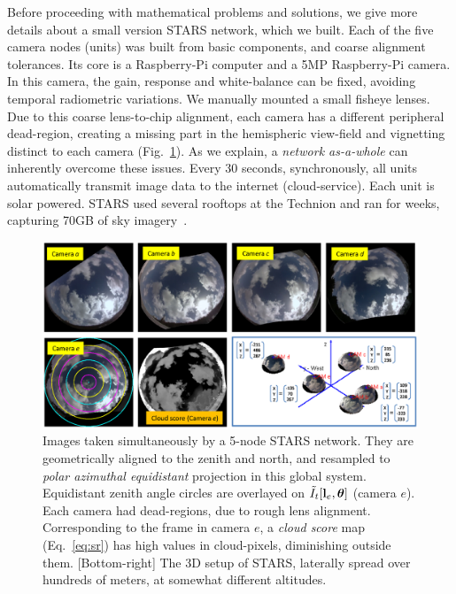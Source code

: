 \documentclass[runningheads]{llncs}
\begin{document}
Before proceeding with mathematical problems and solutions, we give more details about a small version STARS network, which we built. Each of the five camera nodes (units) was built from basic components, and coarse alignment tolerances. Its core is a Raspberry-Pi computer and a 5MP Raspberry-Pi camera. In this camera, the gain, response and white-balance can be fixed, avoiding temporal radiometric variations. We manually mounted a small fisheye lenses. Due to this coarse lens-to-chip alignment, each camera has a different peripheral dead-region, creating a missing part in the hemispheric view-field and vignetting distinct to each camera (Fig.~\ref{fig:photomotion}). As we explain, a {\em {\em network} as-a-whole} can inherently overcome these issues. Every 30 seconds, synchronously, all units automatically transmit image data to the internet (cloud-service). Each unit is solar powered.
STARS used several rooftops at the Technion and ran for weeks, capturing 70GB of sky imagery~\cite{download}.
\begin{figure}[t!]
\begin{center}
   \includegraphics[width=1\linewidth]{figures/scene_d.eps}
\end{center}
   \vspace{-1.2cm}
   \caption{Images taken simultaneously by a 5-node STARS network. They are geometrically aligned to the zenith and north, and resampled to {\em polar azimuthal equidistant} projection in this global system. Equidistant zenith angle circles are overlayed on $\tilde I_t[{\bf l}_e,{\bm \theta}]$ (camera $e$). Each camera had dead-regions, due to rough lens alignment.
   Corresponding to the frame in camera $e$, a {\em cloud score} map (Eq.~\ref{eq:sr}) has high values in cloud-pixels, diminishing outside them. [Bottom-right] The 3D setup of STARS, laterally spread over hundreds of meters, at somewhat different altitudes.}
\label{fig:photomotion}
\end{figure}
\end{document}
